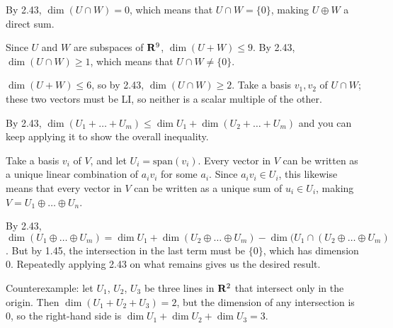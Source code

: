 \documentclass{article}
\begin{document}

By 2.43, $\dim(U \cap W) = 0$, which means that $U \cap W = \{0\}$, making $U
\oplus W$ a direct sum.


Since $U$ and $W$ are subspaces of $\mathbf{R}^9$, $\dim(U+W) \leq 9$. By 2.43, $\dim
(U \cap W) \geq 1$, which means that $U \cap W \neq \{0\}$.


$\dim(U + W) \leq 6$, so by 2.43, $\dim(U \cap W) \geq 2$. Take a basis $v_1,
v_2$ of $U \cap W$; these two vectors must be LI, so neither is a scalar
multiple of the other.


By 2.43, $\dim(U_1 + \ldots + U_m) \leq \dim U_1 + \dim (U_2 + \ldots + U_m)$
and you can keep applying it to show the overall inequality.


Take a basis $v_i$ of $V$, and let $U_i = \text{span}(v_i)$. Every vector in $V$
can be written as a unique linear combination of $a_iv_i$ for some $a_i$. Since
$a_iv_i \in U_i$, this likewise means that every vector in $V$ can be written as
a unique sum of $u_i \in U_i$, making $V = U_1 \oplus \ldots \oplus U_n$.


By 2.43, $\dim(U_1 \oplus \ldots \oplus U_m) = \dim U_1 + \dim(U_2 \oplus \ldots
\oplus U_m) - \dim(U_1 \cap (U_2 \oplus \ldots \oplus U_m)$. But by 1.45, the
intersection in the last term must be $\{0\}$, which has dimension 0. Repeatedly
applying 2.43 on what remains gives us the desired result.


Counterexample: let $U_1$, $U_2$, $U_3$ be three lines in $\mathbf{R}^2$ that
intersect only in the origin. Then $\dim(U_1 + U_2 + U_3) = 2$, but the
dimension of any intersection is 0, so the right-hand side is $\dim U_1 + \dim
U_2 + \dim U_3 = 3$.
\end{document}
